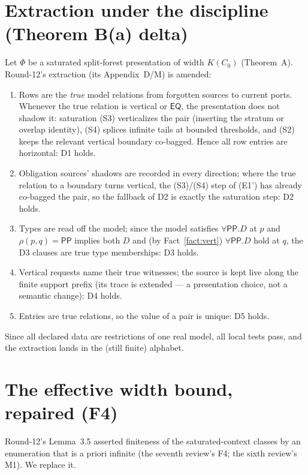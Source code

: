 \documentclass[11pt]{article}
\theoremstyle{definition}
\newcommand{\EQ}{\mathsf{EQ}}
\newcommand{\PP}{\mathsf{PP}}
\begin{document}
\section{Extraction under the discipline (Theorem B(a) delta)}
\label{sec:extract}

Let $\Phi$ be a saturated split-forest presentation of width $K(C_0)$
(Theorem~A).  Round-12's extraction (its Appendix~D/M) is amended:

\begin{enumerate}[label=(E\arabic*'),leftmargin=2.6em]
\item Rows are the \emph{true} model relations from forgotten sources to
current ports.  Whenever the true relation is vertical or $\EQ$, the
presentation does not shadow it: saturation (S3) verticalizes the pair
(inserting the stratum or overlap identity), (S4) splices infinite
tails at bounded thresholds, and (S2) keeps the relevant vertical
boundary co-bagged.  Hence all row entries are horizontal: D1 holds.
\item Obligation sources' shadows are recorded in every direction; where
the true relation to a boundary turns vertical, the (S3)/(S4) step of
(E1') has already co-bagged the pair, so the fallback of D2 is exactly
the saturation step: D2 holds.
\item Types are read off the model; since the model satisfies
$\forall\PP.D$ at $p$ and $\rho(p,q)=\PP$ implies both $D$ and (by
Fact~\ref{fact:vert}) $\forall\PP.D$ hold at $q$, the D3 clauses are
true type memberships: D3 holds.
\item Vertical requests name their true witnesses; the source is kept
live along the finite support prefix (its trace is extended --- a
presentation choice, not a semantic change): D4 holds.
\item Entries are true relations, so the value of a pair is unique: D5
holds.
\end{enumerate}

Since all declared data are restrictions of one real model, all local
tests pass, and the extraction lands in the (still finite) alphabet.

\section{The effective width bound, repaired (F4)}\label{sec:width}

Round-12's Lemma~3.5 asserted finiteness of the saturated-context
classes by an enumeration that is a priori infinite (the seventh review's
F4; the sixth review's M1).  We replace it.
\end{document}
